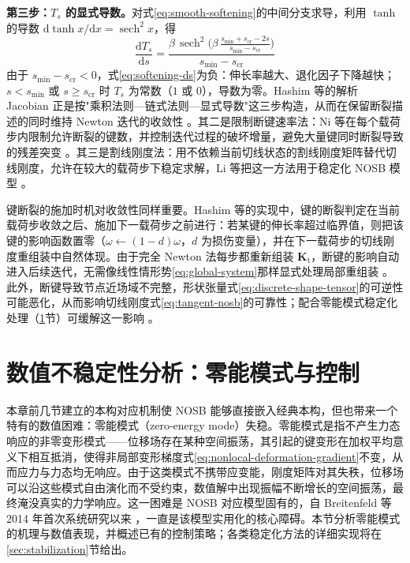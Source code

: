 \textbf{第三步：$T_{s}$ 的显式导数。}对式\eqref{eq:smooth-softening}的中间分支求导，利用 $\tanh$ 的导数 $\mathrm{d}\tanh x/\mathrm{d}x=\operatorname{sech}^{2}x$，得
\begin{equation}
  \frac{\mathrm{d}T_{s}}{\mathrm{d}s}
  =\frac{\beta\,\operatorname{sech}^{2}\bigl(\beta\,\frac{s_{\min}+s_{\mathrm{cr}}-2s}{s_{\min}-s_{\mathrm{cr}}}\bigr)}{s_{\min}-s_{\mathrm{cr}}}
  \label{eq:softening-ds}
\end{equation}
由于 $s_{\min}-s_{\mathrm{cr}}<0$，式\eqref{eq:softening-ds}为负：伸长率越大、退化因子下降越快；$s<s_{\min}$ 或 $s\ge s_{\mathrm{cr}}$ 时 $T_{s}$ 为常数（$1$ 或 $0$），导数为零。Hashim 等的解析 Jacobian 正是按"乘积法则—链式法则—显式导数"这三步构造，从而在保留断裂描述的同时维持 Newton 迭代的收敛性 \cite{Hashim2020}。其二是限制断键速率法：Ni 等在每个载荷步内限制允许断裂的键数，并控制迭代过程的破坏增量，避免大量键同时断裂导致的残差突变 \cite{Ni2019}。其三是割线刚度法：用不依赖当前切线状态的割线刚度矩阵替代切线刚度，允许在较大的载荷步下稳定求解，Li 等把这一方法用于稳定化 NOSB 模型 \cite{Li2019}。

\begin{remark}
  键断裂的施加时机对收敛性同样重要。Hashim 等的实现中，键的断裂判定在当前载荷步收敛之后、施加下一载荷步之前进行：若某键的伸长率超过临界值，则把该键的影响函数置零（$\omega\leftarrow(1-d)\omega$，$d$ 为损伤变量），并在下一载荷步的切线刚度重组装中自然体现。由于完全 Newton 法每步都重新组装 $\mathbf{K}_{\mathrm{t}}$，断键的影响自动进入后续迭代，无需像线性情形势\eqref{eq:global-system}那样显式处理局部重组装 \cite{Hashim2020,Ni2019}。此外，断键导致节点近场域不完整，形状张量式\eqref{eq:discrete-shape-tensor}的可逆性可能恶化，从而影响切线刚度式\eqref{eq:tangent-nosb}的可靠性；配合零能模式稳定化处理（\ref{sec:zero-energy}节）可缓解这一影响 \cite{Hashim2020}。
\end{remark}

\section{数值不稳定性分析：零能模式与控制}\label{sec:zero-energy}

本章前几节建立的本构对应机制使 NOSB 能够直接嵌入经典本构，但也带来一个特有的数值困难：零能模式（zero-energy mode）失稳。零能模式是指不产生力态响应的非零变形模式——位移场存在某种空间振荡，其引起的键变形在加权平均意义下相互抵消，使得非局部变形梯度式\eqref{eq:nonlocal-deformation-gradient}不变，从而应力与力态均无响应。由于这类模式不携带应变能，刚度矩阵对其失秩，位移场可以沿这些模式自由演化而不受约束，数值解中出现振幅不断增长的空间振荡，最终淹没真实的力学响应。这一困难是 NOSB 对应模型固有的，自 Breitenfeld 等 2014 年首次系统研究以来 \cite{Breitenfeld2014}，一直是该模型实用化的核心障碍。本节分析零能模式的机理与数值表现，并概述已有的控制策略；各类稳定化方法的详细实现将在 \ref{sec:stabilization}节给出。


